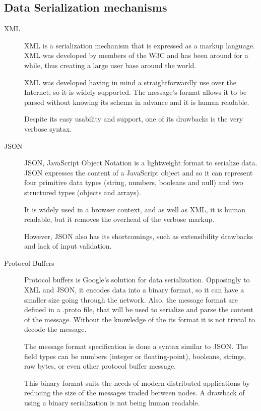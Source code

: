 \subsection{Data Serialization mechanisms}

\begin{description}

\item[XML ~\cite{xml}] XML is a serialization mechanism that is expressed as a markup language. XML was developed by members of the W3C and has been around for a while, thus creating a large user base around the world.\par
	XML was developed having in mind a straightforwardly use over the Internet, so it is widely supported. The message's format allows it to be parsed without knowing its schema in advance and it is human readable.\par
	Despite its easy usability and support, one of its drawbacks is the very verbose syntax.

\item[JSON ~\cite{json}] JSON, JavaScript Object Notation is a lightweight format to serialize data. JSON expresses the content of a JavaScript object and so it can represent four primitive data types (string, numbers, booleans and null) and two structured types (objects and arrays).\par
	It is widely used in a browser context, and as well as XML, it is human readable, but it removes the overhead of the verbose markup.\par
	However, JSON also has its shortcomings, such as extensibility drawbacks and lack of input validation.

\item[Protocol Buffers ~\cite{protocol_buffers}]
Protocol buffers is Google's solution for data serialization. Opposingly to XML and JSON, it encodes data into a binary format, so it can have a smaller size going through the network. Also, the message format are defined in a .proto file, that will be used to serialize and parse the content of the message. Without the knowledge of the its format it is not trivial to decode the message.\par
	The message format specification is done a syntax similar to JSON. The field types can be numbers (integer or floating-point), booleans, strings, raw bytes, or even other protocol buffer message.\par
	This binary format suits the needs of modern distributed applications by reducing the size of the messages traded between nodes. A drawback of using a binary serialization is not being human readable.

\end{description}


